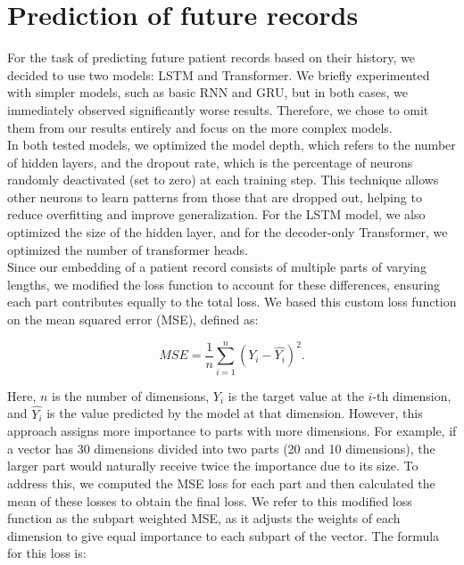 
\section{Prediction of future records}
\label{recordPredImple}

For the task of predicting future patient records based on their history, we decided to use two models: LSTM and Transformer. We briefly experimented with simpler models, such as basic RNN and GRU, but in both cases, we immediately observed significantly worse results. Therefore, we chose to omit them from our results entirely and focus on the more complex models.
\\

In both tested models, we optimized the model depth, which refers to the number of hidden layers, and the dropout rate, which is the percentage of neurons randomly deactivated (set to zero) at each training step. This technique allows other neurons to learn patterns from those that are dropped out, helping to reduce overfitting and improve generalization. For the LSTM model, we also optimized the size of the hidden layer, and for the decoder-only Transformer, we optimized the number of transformer heads.
\\  

Since our embedding of a patient record consists of multiple parts of varying lengths, we modified the loss function to account for these differences, ensuring each part contributes equally to the total loss. We based this custom loss function on the mean squared error (MSE), defined as:

\begin{equation}
	\label{eqn:mse}
	MSE = \frac{1}{n}\sum_{i=1}^{n}(Y_i-\hat{Y_i})^2.
\end{equation} 

Here, $n$ is the number of dimensions, $Y_i$ is the target value at the $i$-th dimension, and $\hat{Y_i}$ is the value predicted by the model at that dimension. However, this approach assigns more importance to parts with more dimensions. For example, if a vector has 30 dimensions divided into two parts (20 and 10 dimensions), the larger part would naturally receive twice the importance due to its size. To address this, we computed the MSE loss for each part and then calculated the mean of these losses to obtain the final loss. We refer to this modified loss function as the subpart weighted MSE, as it adjusts the weights of each dimension to give equal importance to each subpart of the vector. The formula for this loss is:

